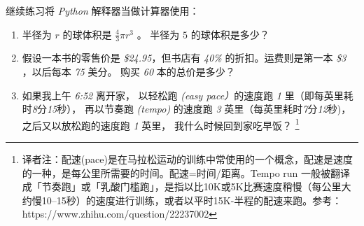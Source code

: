 %
\begin{exercise}



继续练习将 {\em Python} 解释器当做计算器使用：

\begin{enumerate}

\item 半径为 $r$ 的球体积是 $\frac{4}{3} \pi r^3$ 。 半径为 $5$ 的球体积是多少？

\item 假设一本书的零售价是 {\em \$24.95}，但书店有 {\em 40\%} 的折扣。运费则是第一本 {\em \$3} ，以后每本 {\em 75} 美分。 购买 {\em 60} 本的总价是多少？

\item 如果我上午 {\em 6:52} 离开家， 以轻松跑 {\em (easy pace）}的速度跑 {\em 1} 里（即每英里耗时{\em 8}分{\em 15}秒）， 再以节奏跑 {\em (tempo)} 的速度跑 {\em 3} 英里（每英里耗时{\em 7}分{\em 12}秒)， 之后又以放松跑的速度跑 {\em 1} 英里， 我什么时候回到家吃早饭？ \footnote{译者注：配速(pace)是在马拉松运动的训练中常使用的一个概念，配速是速度的一种，是每公里所需要的时间。配速=时间/距离。Tempo run 一般被翻译成「节奏跑」或「乳酸门槛跑」，是指以比10K或5K比赛速度稍慢（每公里大约慢10--15秒）的速度进行训练，或者以平时15K-半程的配速来跑。参考：https://www.zhihu.com/question/22237002}

\end{enumerate}

\end{exercise}